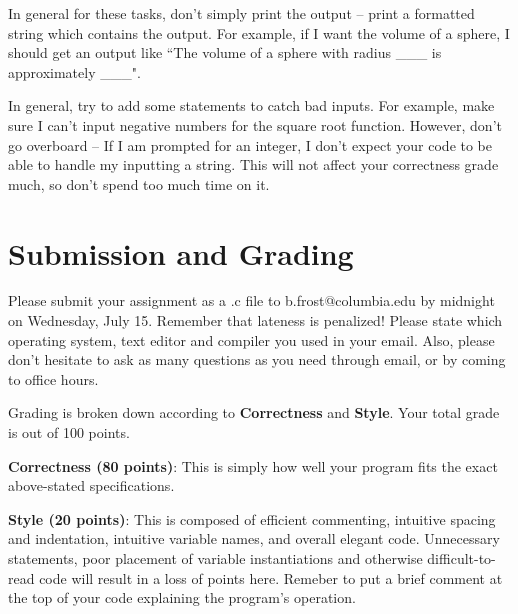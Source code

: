 \documentclass{article}
\begin{document}
In general for these tasks, don't simply print the output -- print a formatted string which contains the output. For example, if I want the volume of a sphere, I should get an output like ``The volume of a sphere with radius \_\_\_ is approximately \_\_\_". 

In general, try to add some statements to catch bad inputs. For example, make sure I can't input negative numbers for the square root function. However, don't go overboard -- If I am prompted for an integer, I don't expect your code to be able to handle my inputting a string. This will not affect your correctness grade much, so don't spend too much time on it.

\section*{Submission and Grading}
Please submit your assignment as a .c file to b.frost@columbia.edu by midnight on Wednesday, July 15. Remember that lateness is penalized! Please state which operating system, text editor and compiler you used in your email. Also, please don't hesitate to ask as many questions as you need through email, or by coming to office hours.

Grading is broken down according to \textbf{Correctness} and \textbf{Style}. Your total grade is out of 100 points.

\noindent\textbf{Correctness (80 points)}: This is simply how well your program fits the exact above-stated specifications.

\noindent\textbf{Style (20 points)}: This is composed of efficient commenting, intuitive spacing and indentation, intuitive variable names, and overall elegant code. Unnecessary statements, poor placement of variable instantiations and otherwise difficult-to-read code will result in a loss of points here. Remeber to put a brief comment at the top of your code explaining the program's operation.
\end{document}
